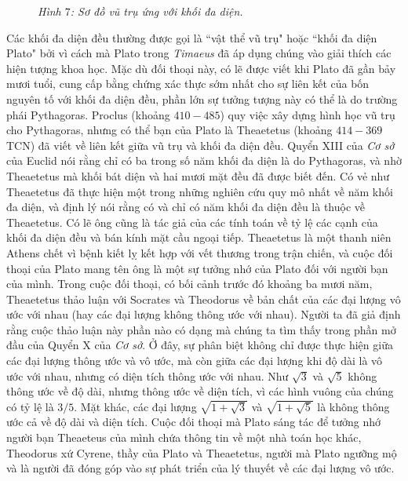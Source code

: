\begin{multicols}{2}
\begin{figure}[H]
				\caption{\small\textit{\color{lichsutoanhoc}Hình $7$: Sơ đồ vũ trụ ứng với khối đa diện.}}
				\vspace*{-10pt}
			\end{figure}
		Các khối đa diện đều thường được gọi là ``vật thể vũ trụ" hoặc ``khối đa diện Plato" bởi vì cách mà Plato trong \textit{Timaeus} đã áp dụng chúng vào giải thích các hiện tượng khoa học.
		\vskip 0.1cm
		Mặc dù đối thoại này, có lẽ được viết khi Plato đã gần bảy mươi tuổi, cung cấp bằng chứng xác thực sớm nhất cho sự liên kết của bốn nguyên tố với khối đa diện đều, phần lớn sự tưởng tượng này có thể là do trường phái Pythagoras.
		\vskip 0.1cm
		Proclus (khoảng $410-485$) quy việc xây dựng hình học vũ trụ cho Pythagoras, nhưng có thể bạn của Plato là Theaetetus (khoảng $414-369$ TCN) đã viết về liên kết giữa vũ trụ và khối đa diện đều. 
		\vskip 0.1cm
		Quyển XIII của \textit{Cơ sở} của Euclid nói rằng chỉ có ba trong số năm khối đa diện là do Pythagoras, và nhờ Theaetetus mà khối bát diện và hai mươi mặt đều đã được biết đến.
		\vskip 0.1cm
		Có vẻ như Theaetetus đã thực hiện một trong những nghiên cứu quy mô nhất về năm khối đa diện, và định lý nói rằng có và chỉ có năm khối đa diện đều là thuộc về Theaetetus. Có lẽ ông cũng là tác giả của các tính toán về tỷ lệ các cạnh của khối đa diện đều và bán kính mặt cầu ngoại tiếp. 
		\vskip 0.1cm
		Theaetetus là một thanh niên Athens chết vì bệnh kiết lỵ kết hợp với vết thương trong trận chiến, và cuộc đối thoại của Plato mang tên ông là một sự tưởng nhớ của Plato đối với người bạn của mình.
		\vskip 0.1cm
		Trong cuộc đối thoại, có bối cảnh trước đó khoảng ba mươi năm, Theaetetus thảo luận với Socrates và Theodorus về bản chất của các đại lượng vô ước với nhau (hay các đại lượng không thông ước với nhau). Người ta đã giả định rằng cuộc thảo luận này phần nào có dạng mà chúng ta tìm thấy trong phần mở đầu của Quyển X của \textit{Cơ sở}.
		\vskip 0.1cm
		Ở đây, sự phân biệt không chỉ được thực hiện giữa các đại lượng thông ước và vô ước, mà còn giữa các đại lượng khi độ dài là vô ước với nhau, nhưng có diện tích thông ước với nhau. Như $\sqrt{3}$  và $\sqrt{5}$  không thông ước về độ dài, nhưng thông ước về diện tích, vì các hình vuông của chúng có tỷ lệ là $3/5$.
		\vskip 0.1cm
		Mặt khác, các đại lượng  $\sqrt{1 + \sqrt{3}}$  và $\sqrt{1 + \sqrt{5}}$ là không thông ước cả về độ dài và diện tích.
		\vskip 0.1cm
		Cuộc đối thoại mà Plato sáng tác để tưởng nhớ người bạn Theaeteus của mình chứa thông tin về một nhà toán học khác, Theodorus xứ Cyrene, thầy của Plato và Theaetetus, người mà Plato ngưỡng mộ và là người đã đóng góp vào sự phát triển của lý thuyết về các đại lượng vô ước. 

\end{multicols}
